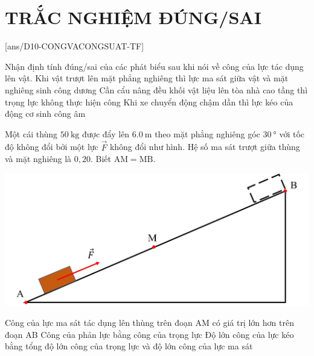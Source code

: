 \section{TRẮC NGHIỆM ĐÚNG/SAI}
\setcounter{ex}{0}
[ans/D10-CONGVACONGSUAT-TF]
\begin{ex}
	Nhận định tính đúng/sai của các phát biểu sau khi nói về công của lực tác dụng lên vật.
	{Khi vật trượt lên mặt phẳng nghiêng thì lực ma sát giữa vật và mặt nghiêng sinh công dương}
	{Cần cẩu nâng đều khối vật liệu lên tòa nhà cao tầng thì trọng lực không thực hiện công}
	{Khi xe chuyển động chậm dần thì lực kéo của động cơ sinh công âm}
	\loigiai{}
\end{ex}
\begin{ex}
	Một cái thùng $\SI{50}{\kilogram}$ được đẩy lên $\SI{6.0}{\meter}$ theo mặt phẳng nghiêng góc $\SI{30}{\degree}$ với tốc độ  không đổi bởi một lực $\vec{F}$ không đổi như hình. Hệ số ma sát trượt giữa thùng và mặt nghiêng là $0,20$. Biết $\mathrm{AM}=\mathrm{MB}$.
	\begin{center}
		\includegraphics[scale=0.35]{../figs/VN10-2023-PH-TP024-P-8}
	\end{center}
	{Công của lực ma sát tác dụng lên thùng trên đoạn AM có giá trị lớn hơn trên đoạn AB}
	{Công của phản lực bằng công của trọng lực}
	{\True Độ lớn công của lực kéo bằng tổng độ lớn công của trọng lực và độ lớn công của lực ma sát}
\end{ex}
